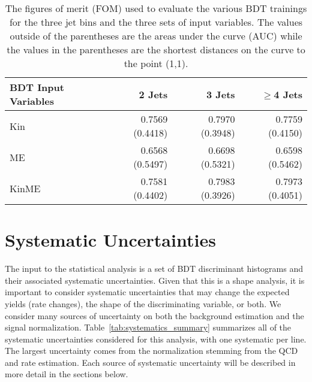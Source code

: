 \begin{table}[htbp]
\centering
\begin{tabular}{lrrr} \hline
BDT Input Variables & 2 Jets          & 3 Jets          & $\geqslant$4 Jets \\\hline
Kin                 & 0.7569 (0.4418) & 0.7970 (0.3948) & 0.7759 (0.4150)   \\
ME                  & 0.6568 (0.5497) & 0.6698 (0.5321) & 0.6598 (0.5462)   \\
KinME               & 0.7581 (0.4402) & 0.7983 (0.3926) & 0.7973 (0.4051)   \\\hline
\end{tabular}
\caption{The  figures of merit (FOM) used to evaluate the various BDT trainings for the three jet bins and the three sets of input variables. The values outside of the parentheses are the areas under the curve (AUC) while the values in the parentheses are the shortest distances on the curve to the point (1,1).}
\label{tab:BDT_FOM_comparison}
\end{table}

\section{Systematic Uncertainties}

The input to the statistical analysis is a set of BDT discriminant histograms and their associated systematic uncertainties.
Given that this is a shape analysis, it is important to consider systematic uncertainties that may change the expected yields (rate changes), the shape of the discriminating variable, or both.
We consider many sources of uncertainty on both the background estimation and the signal normalization.
Table~\ref{tab:systematics_summary} summarizes all of the systematic uncertainties considered for this analysis, with one systematic per line.
The largest uncertainty comes from the \Wjets normalization stemming from the QCD and \Wjets rate estimation.
Each source of systematic uncertainty will be described in more detail in the sections below.

